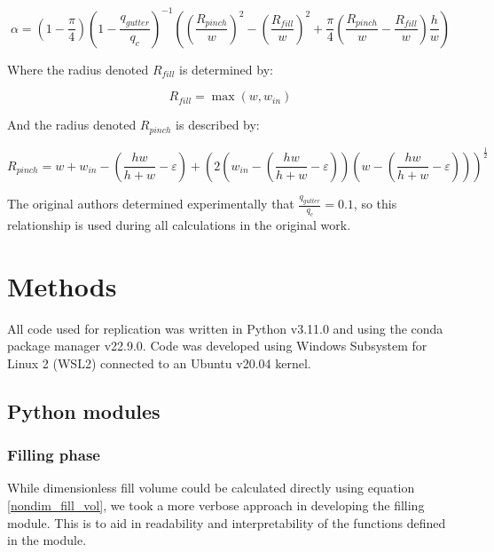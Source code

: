 \begin{equation}
  \alpha = \left(1 - \frac{\pi}{4}\right)
  \left(1 - \frac{q_{gutter}}{q_{c}}\right)^{-1}
  \left(\left(\frac{R_{pinch}}{w}\right)^2 -
  \left(\frac{R_{fill}}{w}\right)^2 +
  \frac{\pi}{4}\left(\frac{R_{pinch}}{w} -
  \frac{R_{fill}}{w}\right)\frac{h}{w}\right)\label{alpha}
\end{equation}

\noindent Where the radius denoted $R_{fill}$ is determined by:

\begin{equation}
  R_{fill} = \max\left(w,w_{in}\right)\label{R_fill}
\end{equation}

\noindent And the radius denoted $R_{pinch}$ is described by:

\begin{equation}
  R_{pinch} = w + w_{in} - \left(\frac{hw}{h+w} - \varepsilon\right) +
  \left(2\left(w_{in} -
    \left(\frac{hw}{h+w} -
    \varepsilon\right)\right)\left(w -
    \left(\frac{hw}{h+w} - \varepsilon\right)\right)\right)^\frac{1}{2}\label{R_pinch}
\end{equation}

\noindent The original authors determined experimentally that $\frac{q_{gutter}}{q_c}=0.1$,
so this relationship is used during all calculations in the original work.

\section{Methods}

All code used for replication was written in Python\supercite{pypi_python_nodate}
v3.11.0 and using the conda\supercite{noauthor_conda_2017} package manager v22.9.0.
Code was developed using Windows Subsystem for Linux 2 (WSL2)\supercite{microsoft_windows_nodate}
connected to an Ubuntu\supercite{canonical_ltd_ubuntu_2020} v20.04 kernel.

\subsection{Python modules}

\subsubsection{Filling phase}

While dimensionless fill volume could be calculated directly using equation \eqref{nondim_fill_vol},
we took a more verbose approach in developing the filling module. This is to aid in readability and
interpretability of the functions defined in the module.

